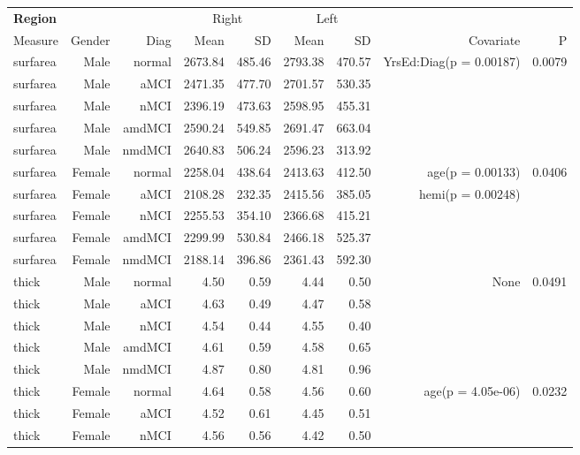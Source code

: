 \documentclass[12pt]{article}
\newcommand\T{\rule{0pt}{2.6ex}}
\newcommand\B{\rule[-1.2ex]{0pt}{0pt}}
\begin{document}
  \newpage
\begin{sidewaystable}
  \centering
  \footnotesize
  \begin{tabular}{l|rr|rr|rr|rr}
	\hline
	\textbf{Region} & & & \multicolumn{2}{c}{Right} \T & \multicolumn{2}{|c}{Left} & & \\
	\multicolumn{1}{l|}{Measure} \T\B & Gender & Diag & Mean & SD & Mean & SD & Covariate & P \\
	\hline\hline
 surfarea & Male & normal & 2673.84 & 485.46 & 2793.38 & 470.57 & YrsEd:Diag(p = 0.00187) & 0.0079 \\ 
  surfarea & Male & aMCI & 2471.35 & 477.70 & 2701.57 & 530.35 &  &  \\ 
  surfarea & Male & nMCI & 2396.19 & 473.63 & 2598.95 & 455.31 &  &  \\ 
  surfarea & Male & amdMCI & 2590.24 & 549.85 & 2691.47 & 663.04 &  &  \\ 
  surfarea & Male & nmdMCI & 2640.83 & 506.24 & 2596.23 & 313.92 &  &  \\ 
   \hline
surfarea & Female & normal & 2258.04 & 438.64 & 2413.63 & 412.50 & age(p = 0.00133) & 0.0406 \\ 
  surfarea & Female & aMCI & 2108.28 & 232.35 & 2415.56 & 385.05 & hemi(p = 0.00248) &  \\ 
  surfarea & Female & nMCI & 2255.53 & 354.10 & 2366.68 & 415.21 &  &  \\ 
  surfarea & Female & amdMCI & 2299.99 & 530.84 & 2466.18 & 525.37 &  &  \\ 
  surfarea & Female & nmdMCI & 2188.14 & 396.86 & 2361.43 & 592.30 &  &  \\ 
   \hline
thick & Male & normal & 4.50 & 0.59 & 4.44 & 0.50 & None & 0.0491 \\ 
  thick & Male & aMCI & 4.63 & 0.49 & 4.47 & 0.58 &  &  \\ 
  thick & Male & nMCI & 4.54 & 0.44 & 4.55 & 0.40 &  &  \\ 
  thick & Male & amdMCI & 4.61 & 0.59 & 4.58 & 0.65 &  &  \\ 
  thick & Male & nmdMCI & 4.87 & 0.80 & 4.81 & 0.96 &  &  \\ 
   \hline
thick & Female & normal & 4.64 & 0.58 & 4.56 & 0.60 & age(p = 4.05e-06) & 0.0232 \\ 
  thick & Female & aMCI & 4.52 & 0.61 & 4.45 & 0.51 &  &  \\ 
  thick & Female & nMCI & 4.56 & 0.56 & 4.42 & 0.50 &  &  \\ 

\end{tabular}
\end{sidewaystable}
\end{document}
